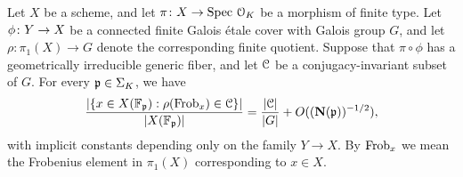 \begin{theorem} \label{theorem:ekedahl}
	Let $X$ be a scheme, and let $\pi\colon X \rightarrow \text{Spec } \mathcal O_K$ be a morphism of finite type. Let $\phi\colon Y \rightarrow X$ be a connected finite Galois \'{e}tale cover with Galois group $G$, and let $\rho \colon \pi_1(X) \to G$ denote the corresponding finite quotient. Suppose that $\pi \circ \phi$ has a geometrically irreducible generic fiber, and let $\mathcal C$ be a conjugacy-invariant subset of $G$. For every $\mathfrak p \in \Sigma_K$, we have
	\[
		\frac{\lvert \{ x \in X({\mathbb F_\mathfrak p}) :  \rho(\operatorname{Frob}_x) \in \mathcal C\} \rvert }{\lvert X({\mathbb F_\mathfrak p}) \rvert} = \frac{|\mathcal C|}{|G|} + O((\mathbf{N} (\mathfrak{p}))^{-1/2}),
	\]
with implicit constants depending only on the family $Y \rightarrow X$. By $\operatorname{Frob}_x$ we mean the Frobenius element in $\pi_1(X)$ corresponding to $x \in X$.
\end{theorem}

